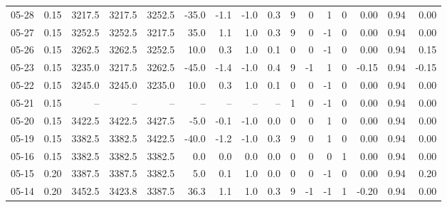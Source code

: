 \begin{threeparttable}
{\begin{tabular}{lrrrrrrrrrrrrrrr}
  05-28 &     0.15 & 3217.5 & 3217.5 & 3252.5 &      -35.0 &           -1.1 &                     -1.0 &                 0.3 &              9 &         0 &     1 &         0 &       0.00 &      0.94 &           0.00 \\
  05-27 &     0.15 & 3252.5 & 3252.5 & 3217.5 &       35.0 &            1.1 &                      1.0 &                 0.3 &              9 &         0 &    -1 &         0 &       0.00 &      0.94 &           0.00 \\
  05-26 &     0.15 & 3262.5 & 3262.5 & 3252.5 &       10.0 &            0.3 &                      1.0 &                 0.1 &              0 &         0 &    -1 &         0 &       0.00 &      0.94 &           0.15 \\
  05-23 &     0.15 & 3235.0 & 3217.5 & 3262.5 &      -45.0 &           -1.4 &                     -1.0 &                 0.4 &              9 &        -1 &     1 &         0 &      -0.15 &      0.94 &          -0.15 \\
  05-22 &     0.15 & 3245.0 & 3245.0 & 3235.0 &       10.0 &            0.3 &                      1.0 &                 0.1 &              0 &         0 &    -1 &         0 &       0.00 &      0.94 &           0.00 \\
  05-21 &     0.15 &     -- &     -- &     -- &         -- &             -- &                       -- &                  -- &              1 &         0 &    -1 &         0 &       0.00 &      0.94 &           0.00 \\
  05-20 &     0.15 & 3422.5 & 3422.5 & 3427.5 &       -5.0 &           -0.1 &                     -1.0 &                 0.0 &              0 &         0 &     1 &         0 &       0.00 &      0.94 &           0.00 \\
  05-19 &     0.15 & 3382.5 & 3382.5 & 3422.5 &      -40.0 &           -1.2 &                     -1.0 &                 0.3 &              9 &         0 &     1 &         0 &       0.00 &      0.94 &           0.00 \\
  05-16 &     0.15 & 3382.5 & 3382.5 & 3382.5 &        0.0 &            0.0 &                      0.0 &                 0.0 &              0 &         0 &     0 &         1 &       0.00 &      0.94 &           0.00 \\
  05-15 &     0.20 & 3387.5 & 3387.5 & 3382.5 &        5.0 &            0.1 &                      1.0 &                 0.0 &              0 &         0 &    -1 &         0 &       0.00 &      0.94 &           0.20 \\
  05-14 &     0.20 & 3452.5 & 3423.8 & 3387.5 &       36.3 &            1.1 &                      1.0 &                 0.3 &              9 &        -1 &    -1 &         1 &      -0.20 &      0.94 &           0.00 \\

\end{tabular}}
\end{threeparttable}
